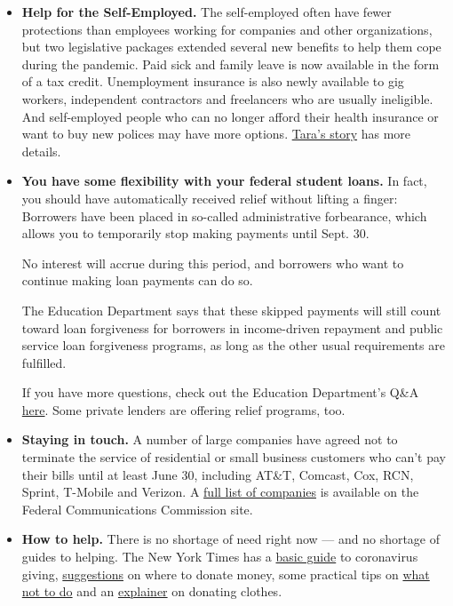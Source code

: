 \begin{itemize}
\item
  \textbf{Help for the Self-Employed.} The self-employed often have
  fewer protections than employees working for companies and other
  organizations, but two legislative packages extended several new
  benefits to help them cope during the pandemic. Paid sick and family
  leave is now available in the form of a tax credit. Unemployment
  insurance is also newly available to gig workers, independent
  contractors and freelancers who are usually ineligible. And
  self-employed people who can no longer afford their health insurance
  or want to buy new polices may have more options.
  \href{https://www.nytimes.com/article/self-employed-workers-unemployment-coronavirus-stimulus-package.html}{Tara's
  story} has more details.
\item
  \textbf{You have some flexibility with your federal student loans.} In
  fact, you should have automatically received relief without lifting a
  finger: Borrowers have been placed in so-called administrative
  forbearance, which allows you to temporarily stop making payments
  until Sept. 30.

  No interest will accrue during this period, and borrowers who want to
  continue making loan payments can do so.

  The Education Department says that these skipped payments will still
  count toward loan forgiveness for borrowers in income-driven repayment
  and public service loan forgiveness programs, as long as the other
  usual requirements are fulfilled.

  If you have more questions, check out the Education Department's Q\&A
  \href{https://studentaid.gov/announcements-events/coronavirus\#borrower-questions}{here}.
  Some private lenders are offering relief programs, too.
\item
  \textbf{Staying in touch.} A number of large companies have agreed not
  to terminate the service of residential or small business customers
  who can't pay their bills until at least June 30, including AT\&T,
  Comcast, Cox, RCN, Sprint, T-Mobile and Verizon. A
  \href{https://www.fcc.gov/keep-americans-connected\#pledges}{full list
  of companies} is available on the Federal Communications Commission
  site.
\item
  \textbf{How to help.} There is no shortage of need right now --- and
  no shortage of guides to helping. The New York Times has a
  \href{https://www.nytimes.com/article/coronavirus-how-to-help-donations-charities.html}{basic
  guide} to coronavirus giving,
  \href{https://www.nytimes.com/2020/03/27/smarter-living/coronavirus-charity-donations.html}{suggestions}
  on where to donate money, some practical tips on
  \href{https://www.nytimes.com/2020/04/10/nyregion/coronavirus-help-healthcare-workers.html}{what
  not to do} and an
  \href{https://www.nytimes.com/2020/04/13/style/self-care/donate-clothes-coronavirus.html}{explainer}
  on donating clothes.


\end{itemize}
